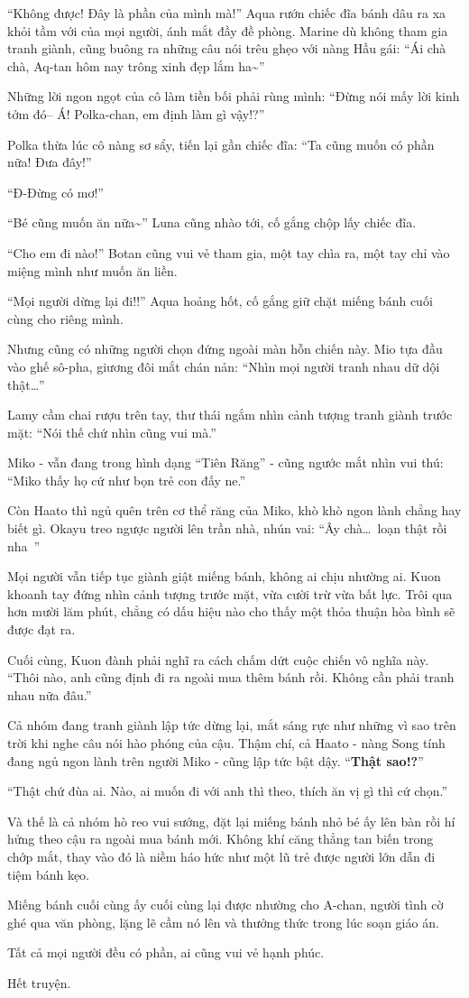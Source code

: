 \documentclass[../main.tex]{subfiles}
\begin{document}

``Không được! Đây là phần của mình mà!'' Aqua rướn chiếc đĩa bánh dâu ra xa khỏi tầm với của mọi người, ánh mắt đầy đề phòng. Marine dù không tham gia tranh giành, cũng buông ra những câu nói trêu ghẹo với nàng Hầu gái: ``Ái chà chà, Aq-tan hôm nay trông xinh đẹp lắm ha\~{}''

Những lời ngon ngọt của cô làm tiền bối phải rùng mình: ``Đừng nói mấy lời kinh tởm đó-- Á! Polka-chan, em định làm gì vậy!?''

Polka thừa lúc cô nàng sơ sẩy, tiến lại gần chiếc đĩa: ``Ta cũng muốn có phần nữa! Đưa đây!''

``Đ-Đừng có mơ!''

``Bé cũng muốn ăn nữa\~{}'' Luna cũng nhào tới, cố gắng chộp lấy chiếc đĩa.

``Cho em đi nào!'' Botan cũng vui vẻ tham gia, một tay chìa ra, một tay chỉ vào miệng mình như muốn ăn liền.

``Mọi người dừng lại đi!!'' Aqua hoảng hốt, cố gắng giữ chặt miếng bánh cuối cùng cho riêng mình.

Nhưng cũng có những người chọn đứng ngoài màn hỗn chiến này. Mio tựa đầu vào ghế sô-pha, giương đôi mắt chán nản: ``Nhìn mọi người tranh nhau dữ dội thật\dots''

Lamy cầm chai rượu trên tay, thư thái ngắm nhìn cảnh tượng tranh giành trước mặt: ``Nói thế chứ nhìn cũng vui mà.''

Miko - vẫn đang trong hình dạng ``Tiên Răng'' - cũng ngước mắt nhìn vui thú: ``Miko thấy họ cứ như bọn trẻ con đấy ne.''

Còn Haato thì ngủ quên trên cơ thể răng của Miko, khò khò ngon lành chẳng hay biết gì. Okayu treo ngược người lên trần nhà, nhún vai: ``Ây chà\dots\ loạn thật rồi nha~{}''

Mọi người vẫn tiếp tục giành giật miếng bánh, không ai chịu nhường ai. Kuon khoanh tay đứng nhìn cảnh tượng trước mặt, vừa cười trừ vừa bất lực. Trôi qua hơn mười lăm phút, chẳng có dấu hiệu nào cho thấy một thỏa thuận hòa bình sẽ được đạt ra.

Cuối cùng, Kuon đành phải nghĩ ra cách chấm dứt cuộc chiến vô nghĩa này. ``Thôi nào, anh cũng định đi ra ngoài mua thêm bánh rồi. Không cần phải tranh nhau nữa đâu.''

Cả nhóm đang tranh giành lập tức dừng lại, mắt sáng rực như những vì sao trên trời khi nghe câu nói hào phóng của cậu. Thậm chí, cả Haato - nàng Song tính đang ngủ ngon lành trên người Miko - cũng lập tức bật dậy. ``\textbf{Thật sao!?}''

``Thật chứ đùa ai. Nào, ai muốn đi với anh thì theo, thích ăn vị gì thì cứ chọn.''

Và thế là cả nhóm hò reo vui sướng, đặt lại miếng bánh nhỏ bé ấy lên bàn rồi hí hửng theo cậu ra ngoài mua bánh mới. Không khí căng thẳng tan biến trong chớp mắt, thay vào đó là niềm háo hức như một lũ trẻ được người lớn dẫn đi tiệm bánh kẹo.

Miếng bánh cuối cùng ấy cuối cùng lại được nhường cho A-chan, người tình cờ ghé qua văn phòng, lặng lẽ cầm nó lên và thưởng thức trong lúc soạn giáo án.

Tất cả mọi người đều có phần, ai cũng vui vẻ hạnh phúc.

Hết truyện.
\end{document}
